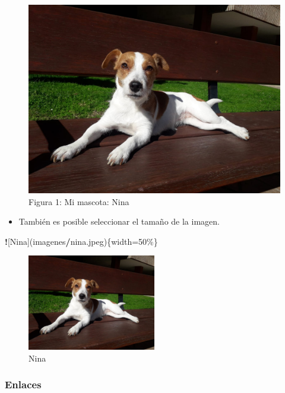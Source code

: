 \documentclass[
]{article}
\newenvironment{Shaded}{\begin{snugshade}}{\end{snugshade}}
\newcommand{\DecValTok}[1]{\textcolor[rgb]{0.00,0.00,0.81}{#1}}
\newcommand{\NormalTok}[1]{#1}
\newcommand{\OtherTok}[1]{\textcolor[rgb]{0.56,0.35,0.01}{#1}}
\newcommand{\SpecialCharTok}[1]{\textcolor[rgb]{0.81,0.36,0.00}{\textbf{#1}}}
\providecommand{\tightlist}{%
  \setlength{\itemsep}{0pt}\setlength{\parskip}{0pt}}
\begin{document}
\begin{figure}
\centering
\includegraphics{imagenes/nina.jpeg}
\caption{Figura 1: Mi mascota: Nina}
\end{figure}

\begin{itemize}
\tightlist
\item
  También es posible seleccionar el tamaño de la imagen.
\end{itemize}

\begin{Shaded}
\begin{Highlighting}[]
\SpecialCharTok{!}\NormalTok{[Nina](imagenes}\SpecialCharTok{/}\NormalTok{nina.jpeg)\{width}\OtherTok{=}\DecValTok{50}\NormalTok{\%\}}
\end{Highlighting}
\end{Shaded}

\begin{figure}
\centering
\includegraphics[width=0.5\textwidth,height=\textheight]{imagenes/nina.jpeg}
\caption{Nina}
\end{figure}

\hypertarget{enlaces}{%
\subsubsection{Enlaces}\label{enlaces}}
\end{document}
